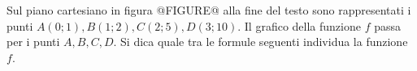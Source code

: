 Sul piano cartesiano 
in figura 
@FIGURE@ alla fine del testo
sono rappresentati i punti 
\(A\left(0;1\right), B\left(1;2\right), C\left(2;5\right), D\left(3;10\right)\).
Il grafico della funzione \(f\) passa per i punti \(A, B, C, D\). 
Si dica quale tra le formule seguenti individua la funzione 
\(f\).